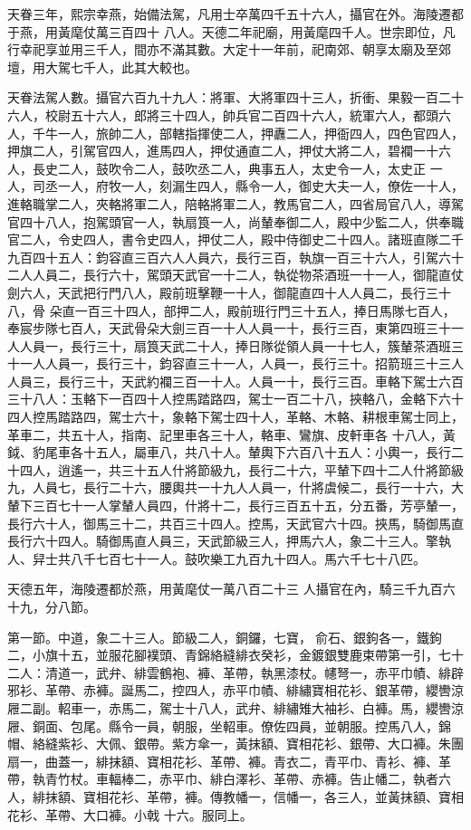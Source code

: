 \begin{pinyinscope}
 天眷三年，熙宗幸燕，始備法駕，凡用士卒萬四千五十六人，攝官在外。海陵遷都于燕，用黃麾仗萬三百四十
 八人。天德二年祀廟，用黃麾四千人。世宗即位，凡行幸祀享並用三千人，間亦不滿其數。大定十一年前，祀南郊、朝享太廟及至郊壇，用大駕七千人，此其大較也。



 天眷法駕人數。攝官六百九十九人：將軍、大將軍四十三人，折衝、果毅一百二十六人，校尉五十六人，郎將三十四人，帥兵官二百四十六人，統軍六人，都頭六人，千牛一人，旅帥二人，部轄指揮使二人，押纛二人，押衙四人，四色官四人，押旗二人，引駕官四人，進馬四人，押仗通直二人，押仗大將二人，碧襴一十六人，長史二人，鼓吹令二人，鼓吹丞二人，典事五人，太史令一人，太史正
 一人，司丞一人，府牧一人，刻漏生四人，縣令一人，御史大夫一人，僚佐一十人，進輅職掌二人，夾輅將軍二人，陪輅將軍二人，教馬官二人，四省局官八人，導駕官四十八人，抱駕頭官一人，執扇筤一人，尚輦奉御二人，殿中少監二人，供奉職官二人，令史四人，書令史四人，押仗二人，殿中侍御史二十四人。諸班直隊二千九百四十五人：鈞容直三百六人人員六，長行三百，執旗一百三十六人，引駕六十二人人員二，長行六十，駕頭天武官一十二人，執從物茶酒班一十一人，御龍直仗劍六人，天武把行門八人，殿前班擊鞭一十人，御龍直四十人人員二，長行三十八，骨
 朵直一百三十四人，部押二人，殿前班行門三十五人，捧日馬隊七百人，奉宸步隊七百人，天武骨朵大劍三百一十人人員一十，長行三百，東第四班三十一人人員一，長行三十，扇筤天武二十人，捧日隊從領人員一十七人，簇輦茶酒班三十一人人員一，長行三十，鈞容直三十一人，人員一，長行三十。招箭班三十三人人員三，長行三十，天武約襴三百一十人。人員一十，長行三百。車輅下駕士六百三十八人：玉輅下一百四十人控馬踏路四，駕士一百二十八，挾輅八，金輅下六十四人控馬踏路四，駕士六十，象輅下駕士四十人，革輅、木輅、耕根車駕士同上，革車二，共五十人，指南、記里車各三十人，輅車、鸞旗、皮軒車各
 十八人，黃鉞、豹尾車各十五人，屬車八，共八十人。輦輿下六百八十五人：小輿一，長行二十四人，逍遙一，共三十五人什將節級九，長行二十六，平輦下四十二人什將節級九，人員七，長行二十六，腰輿共一十九人人員一，什將虞候二，長行一十六，大輦下三百七十一人掌輦人員四，什將十二，長行三百五十五，分五番，芳亭輦一，長行六十人，御馬三十二，共百三十四人。控馬，天武官六十四。挾馬，騎御馬直長行六十四人。騎御馬直人員三，天武節級三人，押馬六人，象二十三人。擎執人、舁士共八千七百七十一人。鼓吹樂工九百九十四人。馬六千七十八匹。



 天德五年，海陵遷都於燕，用黃麾仗一萬八百二十三
 人攝官在內，騎三千九百六十九，分八節。



 第一節。中道，象二十三人。節級二人，銅鑼，七寶，俞石、銀鉤各一，鐵鉤二，小旗十五，並服花腳襆頭、青錦絡縫緋衣癸衫，金鍍銀雙鹿束帶第一引，七十二人：清道一，武弁、緋雲鶴袍、褲、革帶，執黑漆杖。幰弩一，赤平巾幘、緋辟邪衫、革帶、赤褲。誕馬二，控四人，赤平巾幘、緋繡寶相花衫、銀革帶，纓轡涼屜二副。軺車一，赤馬二，駕士十八人，武弁、緋繡雉大袖衫、白褲。馬，纓轡涼屜、銅面、包尾。縣令一員，朝服，坐軺車。僚佐四員，並朝服。控馬八人，錦帽、絡縫紫衫、大佩、銀帶。紫方傘一，黃抹額、寶相花衫、銀帶、大口褲。朱團扇一，曲蓋一，緋抹額、寶相花衫、革帶、褲。青衣二，青平巾、青衫、褲、革帶，執青竹杖。車輻棒二，赤平巾、緋白澤衫、革帶、赤褲。告止幡二，執者六人，緋抹額、寶相花衫、革帶，褲。傳教幡一，信幡一，各三人，並黃抹額、寶相花衫、革帶、大口褲。小戟
 十六。服同上。




\end{pinyinscope}

